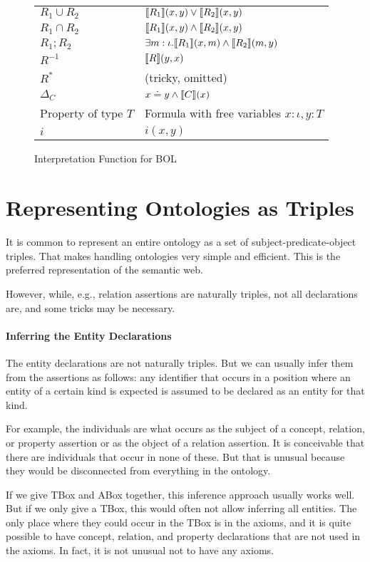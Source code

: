 \begin{figure}
\begin{center}
\begin{tabular}{l|l}
$R_1 \cup R_2$ & $\llbracket R_1\rrbracket(x,y)\vee \llbracket R_2\rrbracket(x,y)$\\
$R_1 \cap R_2$ & $\llbracket R_1\rrbracket(x,y)\wedge \llbracket R_2\rrbracket(x,y)$\\
$R_1 ; R_2$ & $\exists m:\iota.\llbracket R_1\rrbracket(x,m)\wedge \llbracket R_2\rrbracket(m,y)$\\
$R^{-1}$          & $\llbracket R\rrbracket(y,x)$\\
$R^*$          & (tricky, omitted)\\
$\Delta_C$     & $x\doteq y\wedge \llbracket C\rrbracket(x)$\\
\hline
Property of type $T$ & Formula with free variables $x:\iota,y:T$\\
$i$ & $i(x,y)$\\
\end{tabular}
\caption{Interpretation Function for BOL}\label{fig:bolsem}
\end{center}
\end{figure}

\section{Representing Ontologies as Triples}

It is common to represent an entire ontology as a set of subject-predicate-object triples.
That makes handling ontologies very simple and efficient.
This is the preferred representation of the semantic web.

However, while, e.g., relation assertions are naturally triples, not all declarations are, and some tricks may be necessary.

\paragraph{Inferring the Entity Declarations}
The entity declarations are not naturally triples.
But we can usually infer them from the assertions as follows: any identifier that occurs in a position where an entity of a certain kind is expected is assumed to be declared as an entity for that kind.

For example, the individuals are what occurs as the subject of a concept, relation, or property assertion or as the object of a relation assertion.
It is conceivable that there are individuals that occur in none of these.
But that is unusual because they would be disconnected from everything in the ontology.

If we give TBox and ABox together, this inference approach usually works well.
But if we only give a TBox, this would often not allow inferring all entities.
The only place where they could occur in the TBox is in the axioms, and it is quite possible to have concept, relation, and property declarations that are not used in the axioms.
In fact, it is not unusual not to have any axioms.

